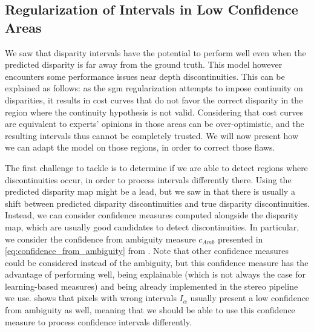 \subsection{Regularization of Intervals in Low Confidence Areas}\label{sec:regularization_of_intervals}
We saw that disparity intervals have the potential to perform well even when the predicted disparity is far away from the ground truth. This model however encounters some performance issues near depth discontinuities. This can be explained as follows: as the \acrshort{sgm} regularization attempts to impose continuity on disparities, it results in cost curves that do not favor the correct disparity in the region where the continuity hypothesis is not valid. Considering that cost curves are equivalent to experts' opinions in those areas can be over-optimistic, and the resulting intervals thus cannot be completely trusted. We will now present how we can adapt the model on those regions, in order to correct those flaws.

The first challenge to tackle is to determine if we are able to detect regions where discontinuities occur, in order to process intervals differently there. Using the predicted disparity map might be a lead, but we saw in  that there is usually a shift between predicted disparity discontinuities and true disparity discontinuities. Instead, we can consider confidence measures computed alongside the disparity map, which are usually good candidates to detect discontinuities. In particular, we consider the confidence from ambiguity measure $c_{Amb}$ presented in \cref{eq:confidence_from_ambiguity} from . Note that other confidence measures could be considered instead of the ambiguity, but this confidence measure has the advantage of performing well, being explainable (which is not always the case for learning-based measures) and being already implemented in the stereo pipeline we use.  shows that pixels with wrong intervals $I_\alpha$ usually present a low confidence from ambiguity as well, meaning that we should be able to use this confidence measure to process confidence intervals differently.

